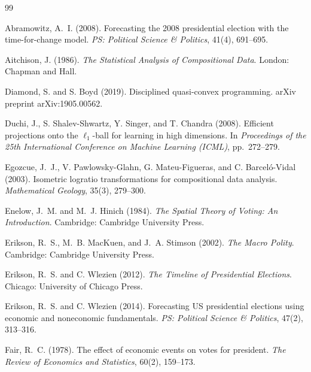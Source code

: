 \documentclass[12pt, letterpaper]{article}
\theoremstyle{definition}
\begin{document}

\begin{thebibliography}{99}

Abramowitz, A.~I. (2008).
\newblock Forecasting the 2008 presidential election with the time-for-change
  model.
\newblock \textit{PS: Political Science \& Politics}, 41(4), 691--695.

Aitchison, J. (1986).
\newblock \textit{The Statistical Analysis of Compositional Data}.
\newblock London: Chapman and Hall.

Diamond, S. and S. Boyd (2019).
\newblock Disciplined quasi-convex programming.
\newblock arXiv preprint arXiv:1905.00562.

Duchi, J., S. Shalev-Shwartz, Y. Singer, and T. Chandra (2008).
\newblock Efficient projections onto the $\ell_1$-ball for learning in high
  dimensions.
\newblock In \textit{Proceedings of the 25th International Conference on
  Machine Learning (ICML)}, pp.\ 272--279.

Egozcue, J.~J., V. Pawlowsky-Glahn, G. Mateu-Figueras, and C. Barcel\'{o}-Vidal
  (2003).
\newblock Isometric logratio transformations for compositional data analysis.
\newblock \textit{Mathematical Geology}, 35(3), 279--300.

Enelow, J.~M. and M.~J. Hinich (1984).
\newblock \textit{The Spatial Theory of Voting: An Introduction}.
\newblock Cambridge: Cambridge University Press.

Erikson, R.~S., M.~B. MacKuen, and J.~A. Stimson (2002).
\newblock \textit{The Macro Polity}.
\newblock Cambridge: Cambridge University Press.

Erikson, R.~S. and C. Wlezien (2012).
\newblock \textit{The Timeline of Presidential Elections}.
\newblock Chicago: University of Chicago Press.

Erikson, R.~S. and C. Wlezien (2014).
\newblock Forecasting US presidential elections using economic and noneconomic
  fundamentals.
\newblock \textit{PS: Political Science \& Politics}, 47(2), 313--316.

Fair, R.~C. (1978).
\newblock The effect of economic events on votes for president.
\newblock \textit{The Review of Economics and Statistics}, 60(2), 159--173.


\end{thebibliography}
\end{document}
